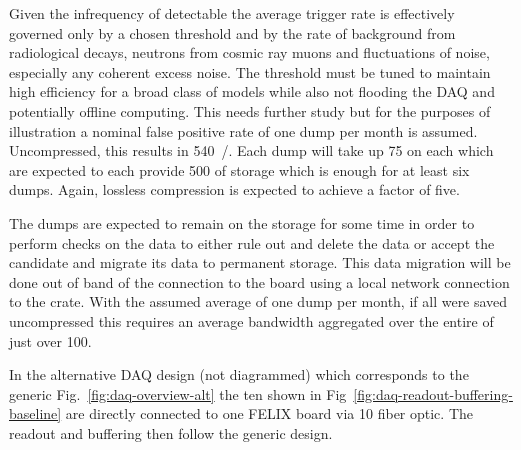 Given the infrequency of detectable  the average
 trigger rate is effectively governed only by a chosen
threshold and by the rate of background from radiological decays,
neutrons from cosmic ray muons and fluctuations of noise, especially
any coherent excess noise. 
The threshold must be tuned to maintain high efficiency for a broad
class of  models while also not flooding the DAQ and
potentially offline computing. 
This needs further study but for the purposes of illustration a
nominal false positive rate of one  dump per month is
assumed. 
Uncompressed, this results in \SI{540}{\TB/\year}. 
Each dump will take up \SI{75}{\GB} on each  which are
expected to each provide \SI{500}{\GB} of storage which is enough for
at least six dumps.
Again, lossless compression is expected to achieve a factor of five.

The  dumps are expected to remain on the 
storage for some time in order to perform checks on the data to either
rule out and delete the data or accept the candidate and migrate its
data to permanent storage. 
This data migration will be done out of band of the connection to the
 board using a local network connection to the
 crate. 
With the assumed average of one dump per month, if all were saved
uncompressed this requires an average bandwidth aggregated over the
entire  of just over \SI{100}{\Mbps}.

In the alternative  DAQ design (not diagrammed) which
corresponds to the generic Fig.~\ref{fig:daq-overview-alt} the ten
 shown in Fig~\ref{fig:daq-readout-buffering-baseline}
are directly connected to one FELIX board via \SI{10}{\Gbps} fiber
optic.  The readout and buffering then follow the generic design.
